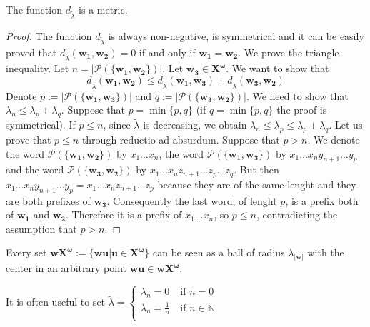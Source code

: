 \documentclass[mat1]{fmfdeloTS2.0}
\newcommand{\N}{\mathbb N}
\newcommand{\obs}{}				%
\newcommand{\word}{\mathbf}				%
\newcommand{\infslovar}{\mathbf{X^\omega}}		%
\newcommand{\prefix}{\mathcal{P}}	%
\begin{document}
\begin{proposition}
The function $d_{\widetilde\lambda}$ is a \obs{metric}. 
\end{proposition}
\begin{proof}
The function $d_{\widetilde\lambda}$ is always non-negative, is symmetrical and it can be easily proved that $d_{\widetilde\lambda}(\word{w_1},\word{w_2})=0$ if and only if $\word{w_1}=\word{w_2}$. We prove the triangle inequality. Let $n=|\prefix(\{\word{w_1},\word{w_2}\})|$. Let $\word{w_3}\in\infslovar$. We want to show that \begin{equation*} 
d_{\widetilde\lambda}(\word{w_1},\word{w_2})\leq d_{\widetilde\lambda}(\word{w_1},\word{w_3})+d_{\widetilde\lambda}(\word{w_3},\word{w_2})
\end{equation*}
Denote $p:=|\prefix(\{\word{w_1},\word{w_3}\})|$ and $q:=|\prefix(\{\word{w_3},\word{w_2}\})|$. We need to show that $\lambda_n\leq\lambda_p+\lambda_q$. Suppose that $p=\min\{p,q\}$ (if $q=\min\{p,q\}$ the proof is symmetrical). If $p\leq n$, since $\widetilde\lambda$ is decreasing, we obtain $\lambda_n\leq \lambda_p\leq \lambda_p + \lambda_q$. 
Let us prove that $p\leq n$ through reductio ad absurdum. Suppose that $p>n$. We denote the word $\prefix(\{\word{w_1},\word{w_2}\})$ by $x_1\ldots x_n$, the word $\prefix(\{\word{w_1},\word{w_3}\})$ by $x_1\ldots x_n y_{n+1}\ldots y_p$ and the word $\prefix(\{\word{w_3},\word{w_2}\})$ by $x_1\ldots x_n z_{n+1}\ldots z_p\ldots z_q$. But then $x_1\ldots x_n y_{n+1}\ldots y_p=x_1\ldots x_n z_{n+1}\ldots z_p$ because they are of the same lenght and they are both prefixes of $\word{w_3}$. Consequently the last word, of lenght $p$, is a prefix both of $\word{w_1}$ and $\word{w_2}$. Therefore it is a prefix of $x_1\ldots x_n$, so $p\leq n$, contradicting the assumption that $p> n$.
\end{proof}

Every set $\word{w}\infslovar:=\{\word{wu}|\word{u}\in\infslovar\}$ can be seen as a ball of radius $\lambda_{|\word{w}|}$ with the center in an arbitrary point $\word{wu}\in \word{w}\infslovar$.

\begin{remark}
It is often useful to set $\widetilde\lambda=\left\{
\begin{array}{ll}
      \lambda_n=0 \;& \text{if }n=0 \\
      \lambda_n=\frac{1}{n}  & \text{if }n\in\N \\
\end{array} 
\right.$
\end{remark}
\end{document}
